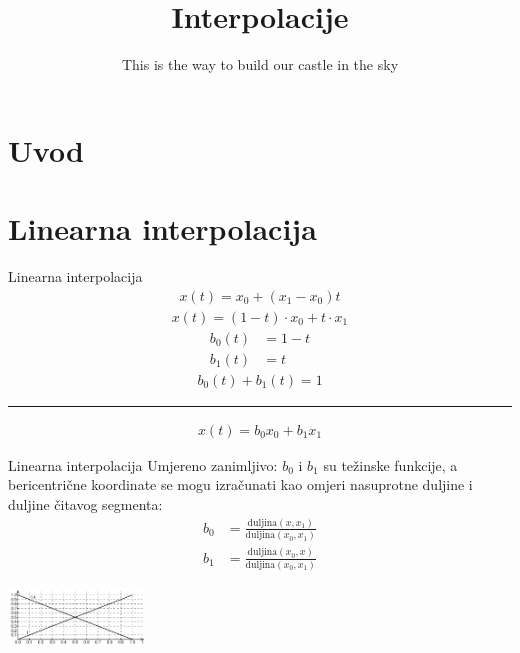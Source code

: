 \documentclass[9pt]{beamer}
\title{Interpolacije}
\subtitle{ This is the way to build our castle in the sky}
\institute{Računalna grafika}
\begin{document}
\begin{frame}
 \titlepage
\end{frame}

\section{Uvod}
\section{Linearna interpolacija}
\begin{frame}{Linearna interpolacija}
	\begin{align*}
	x(t) = x_0 + (x_1-x_0)t
	\end{align*}
	\begin{align*}
	x(t) = (1-t)\cdot x_0 + t\cdot x_1
	\end{align*}
	\begin{align*}
	b_0(t) & = 1-t \\
	b_1(t) & = t
 	\end{align*}
 	\begin{align*}
 	b_0(t) + b_1(t) = 1
 	\end{align*}
 	\hrule\hfill
 	\begin{align*}
 	x(t) = b_0 x_0 + b_1 x_1
 	\end{align*}
\end{frame}
\begin{frame}{Linearna interpolacija}
	Umjereno zanimljivo: $b_0$ i $b_1$ su težinske funkcije, a bericentrične koordinate se mogu izračunati kao omjeri nasuprotne duljine i duljine čitavog segmenta:
	\begin{align*}
	b_0 & = \frac{\textrm{duljina}(x, x_1)}{\textrm{duljina}(x_0, x_1)} \\
	b_1 & = \frac{\textrm{duljina}(x_0, x)}{\textrm{duljina}(x_0, x_1)}
	\end{align*}
	\begin{center}
		\includegraphics[height=1.5cm]{./slike/lin_interp_01.png}
	\end{center}
\end{frame}
\end{document}
